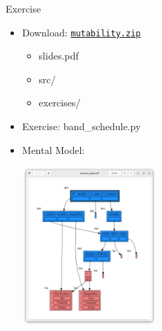 \documentclass[10pt, colorlinks=true, urlcolor=blue]{beamer}
\begin{document}

\begin{frame}{Exercise}
  \begin{itemize}
  \item Download: \href{https://raw.githubusercontent.com/bterwijn/memory_graph_videos/refs/heads/main/mutability/mutability.zip}{\texttt{mutability.zip}}
    \begin{itemize}
    \item slides.pdf
    \item src/
    \item exercises/
    \end{itemize}
  \item Exercise: band\_schedule.py
  \item Mental Model: \begin{center}\includegraphics[width=0.4\textwidth]{figures/band_schedule.png}\end{center}
  \end{itemize}
\end{frame}
\end{document}
